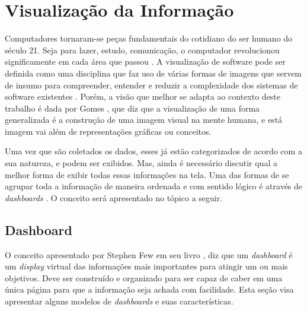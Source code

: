 \section{Visualização da Informação}
Computadores tornaram-se peças fundamentais do cotidiano do ser humano do século 21. Seja para lazer, estudo, comunicação, o computador revolucionou significamente em cada área que passou \cite{hasan_humancomputer_2014}.
A visualização de software pode ser definida como uma disciplina que faz uso de várias formas de imagens que servem de insumo para compreender, entender e reduzir a complexidade dos sistemas de software existentes \cite{gracanin_software_2005}. Porém, a visão que melhor se adapta ao contexto deste trabalho é dada por Gomes \cite{gomes_percepcao_2011}, que diz que a visualização de uma forma generalizada é a construção de uma imagem visual na mente humana, e está imagem vai além de representações gráficas ou conceitos.

Uma vez que são coletados os dados, esses já estão categorizados de acordo com a sua natureza, e podem ser exibidos. Mas, ainda é necessário discutir qual a melhor forma de exibir  todas essas informações na tela. Uma das formas de se agrupar toda a informação de maneira ordenada e com sentido lógico é através de \textit{dashboards} \cite{book_design}. O conceito será apresentado no tópico a seguir.


\subsection{Dashboard}
O conceito apresentado por Stephen Few em seu livro \cite{book_design}, diz que um \textit{dashboard} é um \textit{display} virtual das informações mais importantes para atingir um ou mais objetivos. Deve ser construído e organizado para ser capaz de caber em uma única página para que a informação seja achada com facilidade. Esta seção visa apresentar alguns modelos de \textit{dashboards} e suas características.


